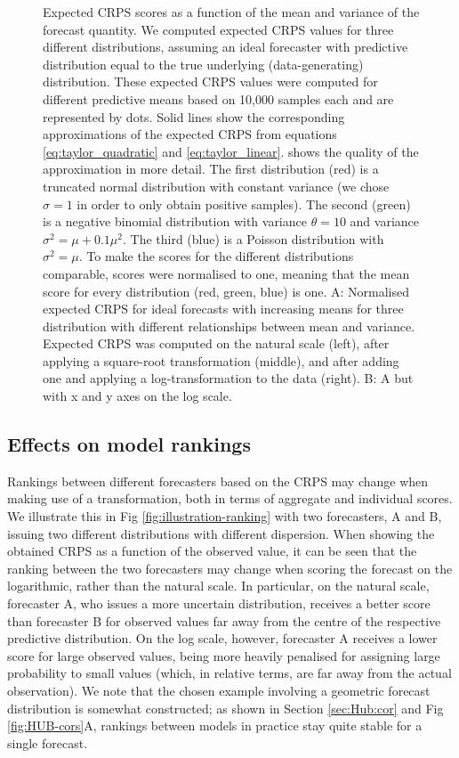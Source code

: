 \documentclass[10pt,letterpaper]{article}
\begin{document}
\begin{figure}[h!]
    \centering
    \caption{Expected CRPS scores as a function of the mean and variance of the forecast quantity. We computed expected CRPS values  for three different distributions, assuming an ideal forecaster with predictive distribution equal to the true underlying (data-generating) distribution. 
    These expected CRPS values were computed for different predictive means based on 10,000 samples each and are represented by dots. Solid lines show the corresponding approximations of the expected CRPS from equations \eqref{eq:taylor_quadratic} and \eqref{eq:taylor_linear}.  shows the quality of the approximation in more detail. 
    The first distribution (red) is a truncated normal distribution with constant variance (we chose $\sigma = 1$ in order to only obtain positive samples). The second (green) is a negative binomial distribution with variance $\theta = 10$ and variance $\sigma^2 = \mu + 0.1\mu^2$. The third (blue) is a
    Poisson distribution with $\sigma^2 = \mu$. To make the scores for the different distributions comparable, scores were normalised to one, meaning that the mean score for every distribution (red, green, blue) is one. 
    A: Normalised expected CRPS for ideal forecasts with increasing means for three distribution with different relationships between mean and variance. Expected CRPS was computed on the natural scale (left), after applying a square-root transformation (middle), and after adding one and applying a log-transformation to the data (right). B: A but with x and y axes on the log scale.}
    \label{fig:SIM-wis-state-size-mean}
\end{figure}


\subsection*{Effects on model rankings}
\label{sec:methods:rankings}
Rankings between different forecasters based on the CRPS may change when making use of a transformation, both in terms of aggregate and individual scores. We illustrate this in Fig \ref{fig:illustration-ranking} with two forecasters, A and B, issuing two different distributions with different dispersion. When showing the obtained CRPS as a function of the observed value, it can be seen that the ranking between the two forecasters may change when scoring the forecast on the logarithmic, rather than the natural scale. In particular, on the natural scale, forecaster A, who issues a more uncertain distribution, receives a better score than forecaster B for observed values far away from the centre of the respective predictive distribution. On the log scale, however, forecaster A receives a lower score for large observed values, being more heavily penalised for assigning large probability to small values (which, in relative terms, are far away from the actual observation). We note that the chosen example involving a geometric forecast distribution is somewhat constructed; as shown in Section \ref{sec:Hub:cor} and Fig \ref{fig:HUB-cors}A, rankings between models in practice stay quite stable for a single forecast. 
\end{document}
